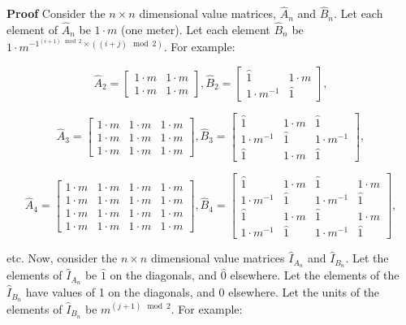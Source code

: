 \documentclass[10pt,letterpaper]{article}
\newenvironment{proof}{\noindent\textbf{Proof} }{\qed \newline}
\newcommand{\qed}{\nobreak \ifvmode \relax \else
      \ifdim\lastskip<1.5em \hskip-\lastskip
      \hskip1.5em plus0em minus0.5em \fi \nobreak
      \vrule height0.75em width0.5em depth0.25em\fi}
\numberwithin{equation}{section}
\begin{document}
\begin{proof}Consider the $n \times n$ dimensional value matrices,
  $\hat A_n$ and $\hat B_n$.  Let each element of $\hat A_n$ be $1
  \cdot m$ (one meter).  Let each element $\hat B_n$ be $1 \cdot
  m^{-1^{(i + 1) \mod 2} \times ((i + j) \mod 2)}$.  For example:
 
\[ \hat A_2 = \left[ \begin{matrix} 
  1 \cdot m & 1 \cdot m \\
  1 \cdot m & 1 \cdot m
 \end{matrix} \right],
 \hat B_2 = \left[ \begin{matrix} 
  \hat 1 & 1 \cdot m \\
  1 \cdot m^{-1} & \hat 1
 \end{matrix} \right], \]

\[ \hat A_3 = \left[ \begin{matrix} 
  1 \cdot m & 1 \cdot m & 1 \cdot m \\
  1 \cdot m & 1 \cdot m & 1 \cdot m \\
  1 \cdot m & 1 \cdot m & 1 \cdot m
 \end{matrix} \right],
 \hat B_3 = \left[ \begin{matrix} 
  \hat 1 & 1 \cdot m & \hat 1 \\
  1 \cdot m^{-1} & \hat 1 & 1 \cdot m^{-1} \\
  \hat 1 & 1 \cdot m & \hat 1
 \end{matrix} \right], \]

\[ \hat A_4 = \left[ \begin{matrix} 
  1 \cdot m & 1 \cdot m & 1 \cdot m & 1 \cdot m \\
  1 \cdot m & 1 \cdot m & 1 \cdot m & 1 \cdot m \\
  1 \cdot m & 1 \cdot m & 1 \cdot m & 1 \cdot m \\
  1 \cdot m & 1 \cdot m & 1 \cdot m & 1 \cdot m
 \end{matrix} \right],
 \hat B_4 = \left[ \begin{matrix} 
  \hat 1 & 1 \cdot m & \hat 1 & 1 \cdot m \\
  1 \cdot m^{-1} & \hat 1 & 1 \cdot m^{-1} & \hat 1 \\
  \hat 1 & 1 \cdot m & \hat 1 & 1 \cdot m \\
  1 \cdot m^{-1} & \hat 1 & 1 \cdot m^{-1} & \hat 1
 \end{matrix} \right], \]

etc.  Now, consider the $n \times n$ dimensional value matrices $\hat
I_{A_n}$ and $\hat I_{B_n}$.  Let the elements of $\hat I_{A_n}$ be
$\hat 1$ on the diagonals, and $\hat 0$ elsewhere.  Let the elements
of the $\hat I_{B_n}$ have values of 1 on the diagonals, and 0
elsewhere.  Let the units of the elements of $\hat I_{B_n}$ be $m^{(j
  + 1) \mod 2}$.  For example:


\end{proof}
\end{document}
